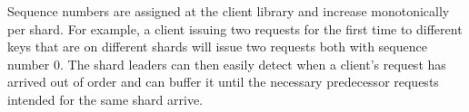 Sequence numbers are assigned at the client library 
and increase monotonically per shard. For example, a client issuing two requests for the first time to different keys that are on different shards will issue two requests both with sequence number 0. The shard leaders can then easily detect when a client's request
has arrived out of order and can buffer it until the necessary predecessor requests intended for the same shard arrive.

